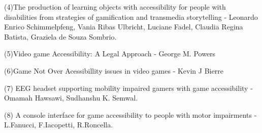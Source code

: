 \documentclass{scrartcl}
\begin{document}
(4)The production of learning objects with accessibility for people with disabilities from strategies of gamification and transmedia storytelling - Leonardo Enrico Schimmelpfeng, Vania Ribas Ulbricht, Luciane Fadel, Claudia Regina Batista, Graziela de Souza Sombrio.

(5)Video game Accessibility: A Legal Approach - George M. Powers

(6)Game Not Over Acessibillity issues in video games - Kevin J Bierre

(7) EEG headset supporting mobility impaired gamers with game accessibility - Omamah Hawsawi, Sudhanshu K. Semwal.

(8) A console interface for game accessibility to people with motor impairments - L.Fanucci,  F.Iacopetti,  R.Roncella.
\end{document}
